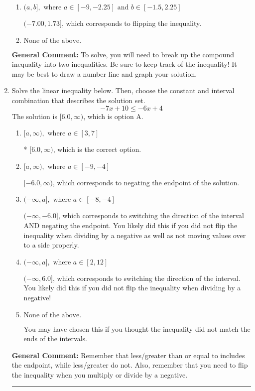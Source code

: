 \documentclass{extbook}[14pt]
\newcommand{\litem}[1]{\item #1

\rule{\textwidth}{0.4pt}}
\begin{document}
\begin{enumerate}
{\begin{enumerate}[label=\Alph*.]
$(-\infty, -7.00] \cup (1.73, \infty)$, which corresponds to displaying the and-inequality as an or-inequality.
\item \( (a, b], \text{ where } a \in [-9, -2.25] \text{ and } b \in [-1.5, 2.25] \)

$(-7.00, 1.73]$, which corresponds to flipping the inequality.
\item \( \text{None of the above.} \)


\end{enumerate}

\textbf{General Comment:} To solve, you will need to break up the compound inequality into two inequalities. Be sure to keep track of the inequality! It may be best to draw a number line and graph your solution.
}
\litem{
Solve the linear inequality below. Then, choose the constant and interval combination that describes the solution set.
\[ -7x + 10 \leq -6x + 4 \]The solution is \( [6.0, \infty) \), which is option A.\begin{enumerate}[label=\Alph*.]
\item \( [a, \infty), \text{ where } a \in [3, 7] \)

* $[6.0, \infty)$, which is the correct option.
\item \( [a, \infty), \text{ where } a \in [-9, -4] \)

 $[-6.0, \infty)$, which corresponds to negating the endpoint of the solution.
\item \( (-\infty, a], \text{ where } a \in [-8, -4] \)

 $(-\infty, -6.0]$, which corresponds to switching the direction of the interval AND negating the endpoint. You likely did this if you did not flip the inequality when dividing by a negative as well as not moving values over to a side properly.
\item \( (-\infty, a], \text{ where } a \in [2, 12] \)

 $(-\infty, 6.0]$, which corresponds to switching the direction of the interval. You likely did this if you did not flip the inequality when dividing by a negative!
\item \( \text{None of the above}. \)

You may have chosen this if you thought the inequality did not match the ends of the intervals.
\end{enumerate}

\textbf{General Comment:} Remember that less/greater than or equal to includes the endpoint, while less/greater do not. Also, remember that you need to flip the inequality when you multiply or divide by a negative.
}
\end{enumerate}
\end{document}
